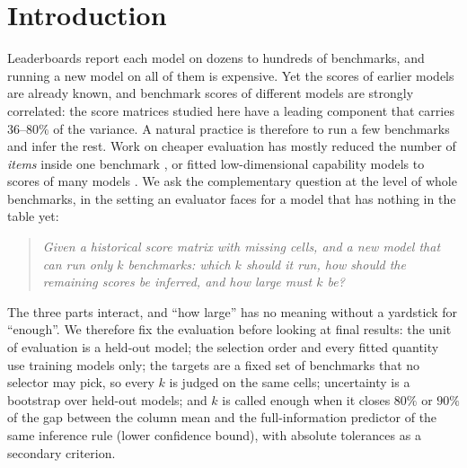 \section{Introduction}
\label{sec:intro}
Leaderboards report each model on dozens to hundreds of benchmarks, and running a new model on all of them is expensive. Yet the scores of earlier models are already known, and benchmark scores of different models are strongly correlated: the score matrices studied here have a leading component that carries $36$--$80\%$ of the variance. A natural practice is therefore to run a few benchmarks and infer the rest. Work on cheaper evaluation has mostly reduced the number of \emph{items} inside one benchmark \citep{polo2024tiny,kipnis2024metabench}, or fitted low-dimensional capability models to scores of many models \citep{ruan2024observational,polo2024sloth}. We ask the complementary question at the level of whole benchmarks, in the setting an evaluator faces for a model that has nothing in the table yet:
\begin{quote}\emph{Given a historical score matrix with missing cells, and a new model that can run only $k$ benchmarks: which $k$ should it run, how should the remaining scores be inferred, and how large must $k$ be?}\end{quote}
The three parts interact, and ``how large'' has no meaning without a yardstick for ``enough''. We therefore fix the evaluation before looking at final results: the unit of evaluation is a held-out model; the selection order and every fitted quantity use training models only; the targets are a fixed set of benchmarks that no selector may pick, so every $k$ is judged on the same cells; uncertainty is a bootstrap over held-out models; and $k$ is called enough when it closes $80\%$ or $90\%$ of the gap between the column mean and the full-information predictor of the same inference rule (lower confidence bound), with absolute tolerances as a secondary criterion.

